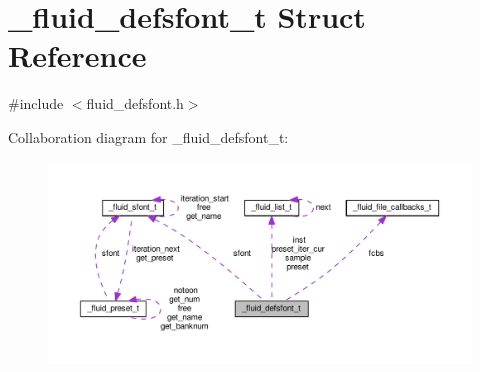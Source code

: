 \hypertarget{struct__fluid__defsfont__t}{}\section{\+\_\+fluid\+\_\+defsfont\+\_\+t Struct Reference}
\label{struct__fluid__defsfont__t}


{\ttfamily \#include $<$fluid\+\_\+defsfont.\+h$>$}



Collaboration diagram for \+\_\+fluid\+\_\+defsfont\+\_\+t\+:
\nopagebreak
\begin{figure}[H]
\begin{center}
\leavevmode
\includegraphics[width=350pt]{struct__fluid__defsfont__t__coll__graph}
\end{center}
\end{figure}
